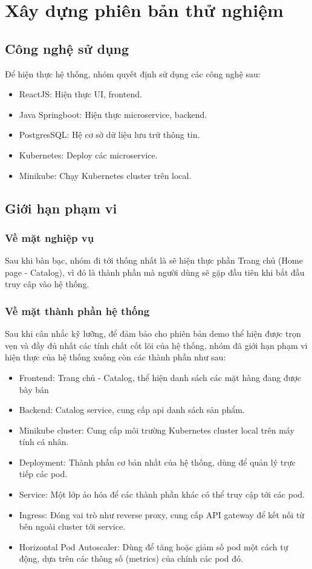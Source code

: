 \chapter{Xây dựng phiên bản thử nghiệm}
\section{Công nghệ sử dụng}
Để hiện thực hệ thống, nhóm quyết định sử dụng các công nghệ sau:
\begin{itemize}
    \item ReactJS: Hiện thực UI, frontend.
    \item Java Springboot: Hiện thực microservice, backend.
    \item PostgresSQL: Hệ cơ sở dữ liệu lưu trữ thông tin.
    \item Kubernetes: Deploy các microservice.
    \item Minikube: Chạy Kubernetes cluster trên local.
\end{itemize}

\section{Giới hạn phạm vi}
\subsection{Về mặt nghiệp vụ}
\noindent Sau khi bàn bạc, nhóm đi tới thống nhất là sẽ hiện thực phần Trang chủ (Home page - Catalog), vì đó là thành phần mà người dùng sẽ gặp đầu tiên khi bắt đầu truy câp vào hệ thống.
\subsection{Về mặt thành phần hệ thống}
\noindent Sau khi cân nhắc kỹ lưỡng, để đảm bảo cho phiên bản demo thể hiện được trọn vẹn và đầy đủ nhất các tính chất cốt lõi của hệ thống, nhóm đã giới hạn phạm vi hiện thực của hệ thống xuống còn các thành phần như sau:
\begin{itemize}
    \item Frontend: Trang chủ - Catalog, thể hiện danh sách các mặt hàng đang được bày bán 
    \item Backend: Catalog service, cung cấp api danh sách sản phẩm.
    \item Minikube cluster: Cung cấp môi trường Kubernetes cluster local trên máy tính cá nhân.
    \item Deployment: Thành phần cơ bản nhất của hệ thống, dùng để quản lý trực tiếp các pod.
    \item Service: Một lớp ảo hóa để các thành phần khác có thể truy cập tới các pod.
    \item Ingress: Đóng vai trò như reverse proxy, cung cấp API gateway để kết nối từ bên ngoài cluster tới service.
    \item Horizontal Pod Autoscaler: Dùng để tăng hoặc giảm số pod một cách tự động, dựa trên các thông số (metrics) của chính các pod đó.
\end{itemize}

